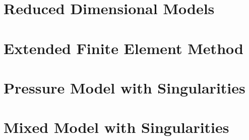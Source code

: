 \documentclass[bibliography=totocnumbered,dvipsnames,FM,Dis, EN]{tulthesis_autoreferat}
\begin{document}



\chapter{Reduced Dimensional Models} \label{chap:reduced}





\chapter{Extended Finite Element Method} \label{chap:xfem_soa}






\chapter{Pressure Model with Singularities} \label{chap:xfem_pressure}







\chapter{Mixed Model with Singularities} \label{chap:xfem_mh}

\end{document}
